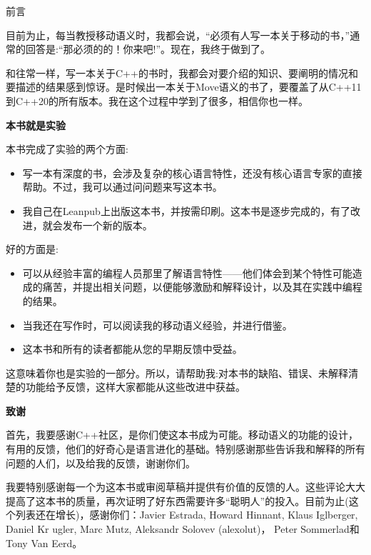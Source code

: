 \begin{flushright}
	 前言
\end{flushright}

目前为止，每当教授移动语义时，我都会说，“必须有人写一本关于移动的书，”通常的回答是:“那必须的的！你来吧!”。现在，我终于做到了。\par

和往常一样，写一本关于C++的书时，我都会对要介绍的知识、要阐明的情况和要描述的结果感到惊讶。是时候出一本关于Move语义的书了，要覆盖了从C++11到C++20的所有版本。我在这个过程中学到了很多，相信你也一样。 \par

\hspace*{\fill} \par %
\textbf{本书就是实验}

本书完成了实验的两个方面:\par
\begin{itemize}
	\item 写一本有深度的书，会涉及复杂的核心语言特性，还没有核心语言专家的直接帮助。不过，我可以通过问问题来写这本书。
	\item 我自己在Leanpub上出版这本书，并按需印刷。这本书是逐步完成的，有了改进，就会发布一个新的版本。
\end{itemize}

好的方面是:\par
\begin{itemize}
	\item 可以从经验丰富的编程人员那里了解语言特性——他们体会到某个特性可能造成的痛苦，并提出相关问题，以便能够激励和解释设计，以及其在实践中编程的结果。
	\item 当我还在写作时，可以阅读我的移动语义经验，并进行借鉴。
	\item 这本书和所有的读者都能从您的早期反馈中受益。
\end{itemize}

这意味着你也是实验的一部分。所以，请帮助我:对本书的缺陷、错误、未解释清楚的功能给予反馈，这样大家都能从这些改进中获益。\par

\hspace*{\fill} \par %
\textbf{致谢}

首先，我要感谢C++社区，是你们使这本书成为可能。移动语义的功能的设计，有用的反馈，他们的好奇心是语言进化的基础。特别感谢那些告诉我和解释的所有问题的人们，以及给我的反馈，谢谢你们。\par

我要特别感谢每一个为这本书或审阅草稿并提供有价值的反馈的人。这些评论大大提高了这本书的质量，再次证明了好东西需要许多“聪明人”的投入。目前为止(这个列表还在增长)，感谢你们：Javier Estrada, Howard Hinnant, Klaus Iglberger, Daniel Kr ugler, Marc Mutz, Aleksandr Solovev (alexolut)， Peter Sommerlad和Tony Van Eerd。\par

